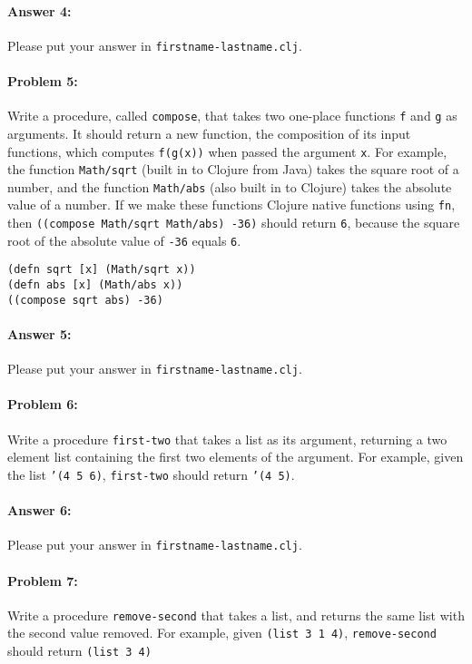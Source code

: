 \documentclass[10pt]{article}
\begin{document}
\paragraph{Answer 4:} Please put your answer in \texttt{firstname-lastname.clj}.

\hrulefill
\paragraph{Problem 5:}
Write a procedure, called \texttt{compose}, that takes two one-place
functions \texttt{f} and \texttt{g} as arguments. It should return a
new function, the composition of its input functions, which computes
\texttt{f(g(x))} when passed the argument \texttt{x}. For example, the
function \texttt{Math/sqrt} (built in to Clojure from Java) takes the
square root of a number, and the function \texttt{Math/abs} (also
built in to Clojure) takes the absolute value of a number. If we make
these functions Clojure native functions using \texttt{fn}, then
\texttt{((compose Math/sqrt Math/abs) -36)} should return \texttt{6},
because the square root of the absolute value of \texttt{-36} equals
\texttt{6}.

\begin{lstlisting}
(defn sqrt [x] (Math/sqrt x))
(defn abs [x] (Math/abs x))
((compose sqrt abs) -36)
\end{lstlisting}

\paragraph{Answer 5:} Please put your answer in \texttt{firstname-lastname.clj}.

\hrulefill
\paragraph{Problem 6:}
  Write a procedure \texttt{first-two} that takes a list as its argument,
  returning a two element list containing the first two elements of
  the argument. For example, given the list \texttt{'(4 5 6)},
  \texttt{first-two} should return \texttt{'(4 5)}.

\paragraph{Answer 6:} Please put your answer in \texttt{firstname-lastname.clj}.

\hrulefill
\paragraph{Problem 7:}
Write a procedure \texttt{remove-second} that takes a list, and
returns the same list with the second value removed. For example,
given \texttt{(list 3 1 4)}, \texttt{remove-second} should return
\texttt{(list 3 4)}
\end{document}

